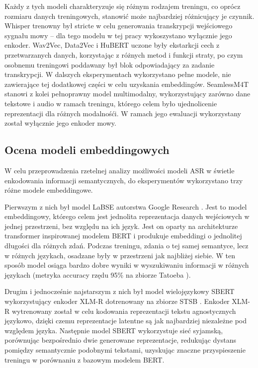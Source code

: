 Każdy z tych modeli charakteryzuje się różnym rodzajem treningu, co oprócz rozmiaru danych treningowych, stanowić może najbardziej różnicujący je czynnik. Whisper trenowny był stricte w celu generowania transkrypcji wejściowego sygnału mowy -- dla tego modelu w tej pracy wykoszystano wyłącznie jego enkoder. Wav2Vec, Data2Vec i HuBERT uczone były ekstarkcji cech z przetwarzanych danych, korzystając z różnych metod i funkcji straty, po czym osobnemu treningowi poddawany był blok odpowiadający za zadanie transkrypcji. W dalszych eksperymentach wykorzystano pełne modele, nie zawierające tej dodatkowej części w celu uzyskania embeddingów. SeamlessM4T stanowi z kolei pełnoprawny model multimodalny, wykorzystujący zarówno dane tekstowe i audio w ramach treningu, którego celem było ujednolicenie reprezentacji dla różnych modalnośći. W ramach jego ewaluacji wykorzystany został wyłącznie jego enkoder mowy.

\subsection{Ocena modeli embeddingowych}
W celu przeprowadzenia rzetelnej analizy możliwości modeli ASR w świetle enkodowania informacji semantycznych, do eksperymentów wykorzystano trzy różne modele embeddingowe.

Pierwszym z nich był model LaBSE autorstwa Google Research \cite{feng-etal-2022-language}. Jest to model embeddingowy, którego celem jest jednolita reprezentacja danych wejściowych w jednej przestrzeni, bez względu na ich język. Jest on oparty na architekturze transformer inspirowanej modelem BERT i produkuje embeddingi o jednolitej długości dla różnych zdań. Podczas treningu, zdania o tej samej semantyce, lecz w różnych językach, osadzane były w przestrzeni jak najbliżej siebie. W ten sposób model osiąga bardzo dobre wyniki w wyszukiwaniu informacji w różnych językach (metryka accuracy rzędu 95\% na zbiorze Tatoeba \cite{tiedemann-2020-tatoeba}).

Drugim i jednocześnie najstarszym z nich był model wielojęzykowy SBERT \cite{reimers2019sentence} wykorzystujący enkoder XLM-R \cite{conneau2020unsupervised} dotrenowany na zbiorze STSB \cite{stsb}. Enkoder XLM-R wytrenowany został w celu kodowania reprezentacji tekstu agnostycznych językowo, dzięki czemu reprezentacje latentne są jak najbardziej niezależne pod względem języka. Następnie model SBERT wykorzystuje sieć syjamską, porównując bezpośrednio dwie generowane reprezentacje, redukując dystans pomiędzy semantycznie podobnymi tekstami, uzyskując znaczne przyspieszenie treningu w porównaniu z bazowym modelem BERT.

